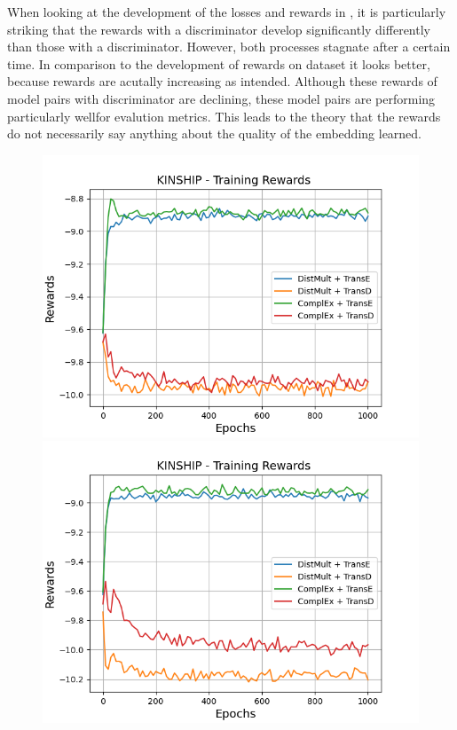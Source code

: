When looking at the development of the losses and rewards in , it is particularly striking that the rewards with a \transe discriminator develop significantly differently than those with a \transd discriminator.
However, both processes stagnate after a certain time.
In comparison to the development of rewards on \umls dataset it looks better, because rewards are acutally increasing as intended.
Although these rewards of model pairs with \transd discriminator are declining, these model pairs are performing particularly wellfor evalution metrics.
This leads to the theory that the rewards do not necessarily say anything about the quality of the embedding learned.
\clearpage
\begin{figure}[H]
    \centering
    \begin{minipage}{.5\textwidth}
      \centering
      \includegraphics[width=0.9\linewidth]{figures/results/gan_train/not_pretrained/uncertainty/max_distribution/entropy/kinship/1k_epochs/uncertainty_kinship_rew.png}
    \end{minipage}%
    \begin{minipage}{.5\textwidth}
      \centering
      \includegraphics[width=0.9\linewidth]{figures/results/gan_train/not_pretrained/uncertainty/max_distribution/least_confidence/kinship/uncertainty_kinship_rew.png}

\end{minipage}
\end{figure}
